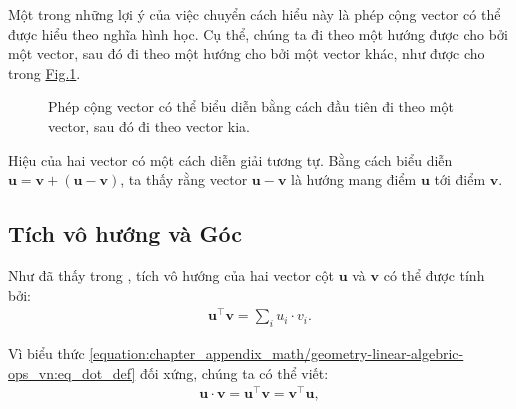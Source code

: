 \documentclass[letterpaper,11pt,english]{sphinxmanual}
\begin{document}
Một trong những lợi ý của việc chuyển cách hiểu này là phép cộng vector
có thể được hiểu theo nghĩa hình học. Cụ thể, chúng ta đi theo một hướng
được cho bởi một vector, sau đó đi theo một hướng cho bởi một vector
khác, như được cho trong \hyperref[\detokenize{chapter_appendix_math/geometry-linear-algebric-ops_vn:fig-add-vec}]{Fig.\@ \ref{\detokenize{chapter_appendix_math/geometry-linear-algebric-ops_vn:fig-add-vec}}}.



\begin{figure}[H]
\centering
\capstart

\noindent{}
\caption{Phép cộng vector có thể biểu diễn bằng cách đầu tiên đi theo một
vector, sau đó đi theo vector kia.}\label{\detokenize{chapter_appendix_math/geometry-linear-algebric-ops_vn:id5}}\label{\detokenize{chapter_appendix_math/geometry-linear-algebric-ops_vn:fig-add-vec}}\end{figure}







Hiệu của hai vector có một cách diễn giải tương tự. Bằng cách biểu diễn
\(\mathbf{u} = \mathbf{v} + (\mathbf{u}-\mathbf{v})\), ta thấy rằng
vector \(\mathbf{u}-\mathbf{v}\) là hướng mang điểm
\(\mathbf{u}\) tới điểm \(\mathbf{v}\).




\subsection{Tích vô hướng và Góc}
\label{\detokenize{chapter_appendix_math/geometry-linear-algebric-ops_vn:tich-vo-huong-va-goc}}


Như đã thấy trong , tích vô hướng của hai
vector cột \(\mathbf{u}\) và \(\mathbf{v}\) có thể được tính
bởi:
\begin{equation}\label{equation:chapter_appendix_math/geometry-linear-algebric-ops_vn:eq_dot_def}
\begin{split}\mathbf{u}^\top\mathbf{v} = \sum_i u_i\cdot v_i.\end{split}
\end{equation}


Vì biểu thức \eqref{equation:chapter_appendix_math/geometry-linear-algebric-ops_vn:eq_dot_def} đối xứng, chúng ta có thể viết:
\begin{equation}\label{equation:chapter_appendix_math/geometry-linear-algebric-ops_vn:chapter_appendix_math/geometry-linear-algebric-ops_vn:2}
\begin{split}\mathbf{u}\cdot\mathbf{v} = \mathbf{u}^\top\mathbf{v} = \mathbf{v}^\top\mathbf{u},\end{split}
\end{equation}
\end{document}
